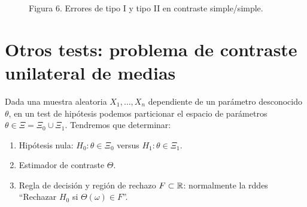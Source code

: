 \begin{figure}[htbp]
  \caption*{Figura 6. Errores de tipo I y tipo II en contraste simple/simple.}
  \label{fig:errores-tipo-i-ii}
\end{figure}















\section{Otros tests: problema de contraste unilateral de medias}

Dada una muestra aleatoria $X_1, \dots, X_n$ dependiente de un parámetro desconocido $\theta$, en un test de hipótesis podemos particionar el espacio de parámetros $\theta \in \Xi = \Xi_0 \cup \Xi_1$. Tendremos que determinar:
\begin{enumerate}
  \item Hipótesis nula: $H_0 : \theta \in \Xi_0$ versus $H_1 : \theta \in \Xi_1$.
  \item Estimador de contraste $\Theta$.
  \item Regla de decisión y región de rechazo $F \subset \mathbb{R}$: normalmente la rddes ``Rechazar $H_0$ si $\Theta(\omega) \in F$''.
\end{enumerate}

